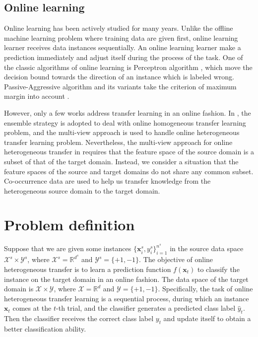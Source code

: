 \documentclass{article} %
\theoremstyle{remark}
\theoremstyle{definition}
\begin{document}
\subsection{Online learning}
Online learning has been actively studied for many years.
Unlike the offline machine learning problem where training data are given first, online learning learner receives data instances sequentially.
An online learning learner make a prediction immediately and adjust itself during the process of the task.
One of the classic algorithms of online learning is Perceptron algorithm \cite{1958perceptronRosenblatt}, which move the decision bound towards the direction of an instance which is labeled wrong.
Passive-Aggressive algorithm and its variants take the criterion of maximum margin into account \cite{2006onlineCrammer}.

However, only a few works address transfer learning in an online fashion.
In \cite{zhao2010otl,zhao2014online}, the ensemble strategy is adopted to deal with online homogeneous transfer learning problem, and the multi-view approach is used to handle online heterogeneous transfer learning problem.
Nevertheless, the multi-view approach for online heterogeneous transfer in \cite{zhao2010otl,zhao2014online} requires that the feature space of the source domain is a subset of that of the target domain.
Instead, we consider a situation that the feature spaces of the source and target domains do not share any common subset.
Co-occurrence data are used to help us transfer knowledge from the heterogeneous source domain to the target domain.

\section{Problem definition}
Suppose that we are given some instances $\{\mathbf{x}_{i}^{s}, y_{i}^{s}\}_{i=1}^{n^s}$ in the source data space $\mathcal{X}^{s} \times \mathcal{Y}^{s}$, where $\mathcal{X}^{s} = \mathbb{R}^{d^s}$ and $\mathcal{Y}^{s} = \{+1,-1\}$.
The objective of online heterogeneous transfer is to learn a prediction function $f(\mathbf{x}_{t})$ to classify the instance on the target domain in an online fashion.
The data space of the target domain is $\mathcal{X} \times \mathcal{Y}$, where $\mathcal{X} = \mathbb{R}^{d}$ and $\mathcal{Y} = \{+1,-1\}$.
Specifically, the task of online heterogeneous transfer learning is a sequential process, during which an instance $\mathbf{x}_t$ comes at the $t$-th trial, and the classifier generates a predicted class label $\hat{y}_{t}$.
Then the classifier receives the correct class label $y_t$ and update itself to obtain a better classification ability.
\end{document}
